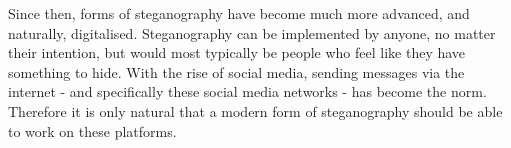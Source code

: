 Since then, forms of steganography have become much more advanced, and naturally, digitalised.
Steganography can be implemented by anyone, no matter their intention, but would most typically be people who feel like they have something to hide.
With the rise of social media, sending messages via the internet - and specifically these social media networks - has become the norm.
Therefore it is only natural that a modern form of steganography should be able to work on these platforms. 
